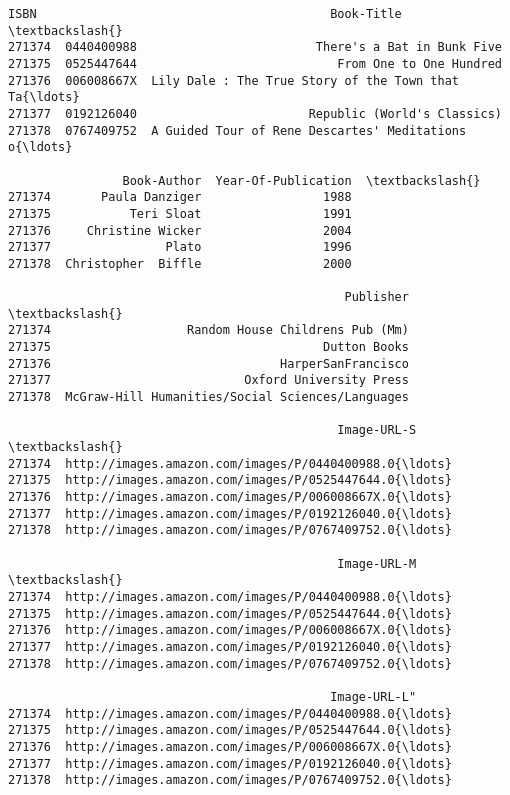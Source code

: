 \documentclass[11pt]{article}
\makeatletter
\newcommand{\boxspacing}{\kern\kvtcb@left@rule\kern\kvtcb@boxsep}
\newcommand{\prompt}[4]{
        {\ttfamily\llap{{\color{#2}[#3]:\hspace{3pt}#4}}\vspace{-\baselineskip}}
    }
\makeatother
\begin{document}
            \begin{tcolorbox}[breakable, size=fbox, boxrule=.5pt, pad at break*=1mm, opacityfill=0]
\prompt{Out}{outcolor}{7}{\boxspacing}
\begin{Verbatim}[commandchars=\\\{\}]
              ISBN                                         Book-Title  \textbackslash{}
271374  0440400988                         There's a Bat in Bunk Five
271375  0525447644                            From One to One Hundred
271376  006008667X  Lily Dale : The True Story of the Town that Ta{\ldots}
271377  0192126040                        Republic (World's Classics)
271378  0767409752  A Guided Tour of Rene Descartes' Meditations o{\ldots}

                Book-Author  Year-Of-Publication  \textbackslash{}
271374       Paula Danziger                 1988
271375           Teri Sloat                 1991
271376     Christine Wicker                 2004
271377                Plato                 1996
271378  Christopher  Biffle                 2000

                                               Publisher  \textbackslash{}
271374                   Random House Childrens Pub (Mm)
271375                                      Dutton Books
271376                                HarperSanFrancisco
271377                           Oxford University Press
271378  McGraw-Hill Humanities/Social Sciences/Languages

                                              Image-URL-S  \textbackslash{}
271374  http://images.amazon.com/images/P/0440400988.0{\ldots}
271375  http://images.amazon.com/images/P/0525447644.0{\ldots}
271376  http://images.amazon.com/images/P/006008667X.0{\ldots}
271377  http://images.amazon.com/images/P/0192126040.0{\ldots}
271378  http://images.amazon.com/images/P/0767409752.0{\ldots}

                                              Image-URL-M  \textbackslash{}
271374  http://images.amazon.com/images/P/0440400988.0{\ldots}
271375  http://images.amazon.com/images/P/0525447644.0{\ldots}
271376  http://images.amazon.com/images/P/006008667X.0{\ldots}
271377  http://images.amazon.com/images/P/0192126040.0{\ldots}
271378  http://images.amazon.com/images/P/0767409752.0{\ldots}

                                             Image-URL-L"
271374  http://images.amazon.com/images/P/0440400988.0{\ldots}
271375  http://images.amazon.com/images/P/0525447644.0{\ldots}
271376  http://images.amazon.com/images/P/006008667X.0{\ldots}
271377  http://images.amazon.com/images/P/0192126040.0{\ldots}
271378  http://images.amazon.com/images/P/0767409752.0{\ldots}
\end{Verbatim}
\end{tcolorbox}
        
\end{document}
